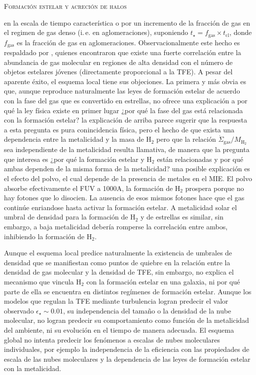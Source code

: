\documentclass[xcolor=dvipsnames,4pt,hyperref={colorlinks,citecolor=black,linkcolor=black,urlcolor=black}]{beamer}
\begin{document}
\begin{frame}[allowframebreaks]{\textsc{Formación estelar y acreción de halos}}
\begin{description}
en la escala de tiempo característica o por un incremento de la fracción de gas en el regimen de gas
denso (i.\,e. en aglomeraciones), suponiendo $t_\star=f_\text{gas}\times t_\text{cl}$, donde
$f_\text{gas}$ es la fracción de gas en aglomeraciones. Observacionalmente este hecho es respaldado
por \citet{Lada2010}, quienes encontraron que existe una fuerte correlación entre la abundancia de
gas molecular en regiones de alta densidad con el número de objetos estelares jóvenes (directamente
proporcional a la TFE).
A pesar del aparente éxito, el esquema local tiene sus objeciones. La primera y más obvia es que,
aunque reproduce naturalmente las leyes de formación estelar de acuerdo con la fase del gas que es
convertido en estrellas, no ofrece una explicación a por qué la ley física existe en primer lugar
¿por qué la fase del gas está relacionada con la formación estelar? la explicación de arriba parece
sugerir que la respuesta a esta pregunta es pura conincidencia física, pero el hecho de que exista
una dependencia entre la metalicidad y la masa de H$_2$ pero que la relación
$\dot{\Sigma}_\text{gas} / M_{\text{H}_2}$ sea independiente de la metalicidad resulta llamativa, de
manera que la pregunta que interesa es ¿por qué la formación estelar y H$_2$ están relacionadas y
por qué ambas dependen de la misma forma de la metalicidad? una posible explicación es el efecto del
polvo, el cual depende de la presencia de metales en el MIE. El polvo absorbe efectivamente el FUV a
1000A, la formación de H$_2$ prospera porque no hay fotones que lo disocien. La ausencia de esos
mismos fotones hace que el gas continúe enriandose hasta activar la formación estelar. A metalicidad
solar el umbral de densidad para la formación de H$_2$ y de estrellas es similar, sin embargo, a
baja metalicidad debería romperse la correlación entre ambos, inhibiendo la formación de H$_2$.

Aunque el esquema local predice naturalmente la existencia de umbrales de densidad que se
manifiestan como puntos de quiebre en la relación entre la densidad de gas molecular y la densidad
de TFE,
sin embargo, no explica el mecanismo que vincula H$_2$ con la formación estelar en una galaxia, ni
por qué parte de ella se encuentra en distintos regímenes de formación estelar. Aunque los modelos
que regulan la TFE mediante turbulencia logran predecir el valor observado $\epsilon_\star\sim0.01$,
su independencia del tamaño o la densidad de la nube molecular, no logran predecir su comportamiento
como función de la metalicidad del ambiente, ni su evolución en el tiempo de manera adecuada. El
esquema global no intenta predecir los fenómenos a escalas de nubes moleculares individuales, por
ejemplo la independencia de la eficiencia con las propiedades de escala de las nubes moleculares y
la dependencia de las leyes de formación estelar con la metalicidad.


\end{description}
\end{frame}
\end{document}
